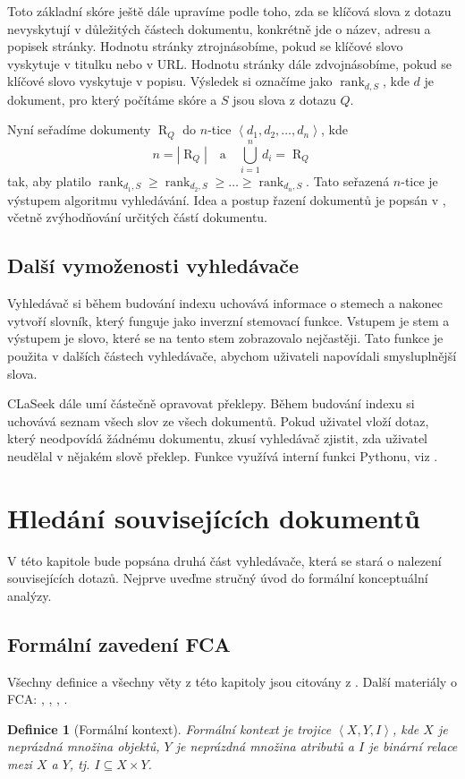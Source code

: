 \documentclass{article}
\newcommand{\name}{CLaSeek}
\newcommand{\ssection}[1]{\subsection{#1}}
\newcommand{\addsp}[1]{\left<#1\right>}
\DeclareMathOperator{\getdocs}{R}
\DeclareMathOperator{\rank}{rank}
\newtheorem{mydef}{Definice}
\begin{document}
Toto základní skóre ještě dále upravíme podle toho, zda se klíčová slova z dotazu nevyskytují v důležitých částech dokumentu, konkrétně jde o název, adresu a popisek stránky. Hodnotu stránky ztrojnásobíme, pokud se klíčové slovo vyskytuje v titulku nebo v URL. Hodnotu stránky dále zdvojnásobíme, pokud se klíčové slovo vyskytuje v popisu. Výsledek si označíme jako $\rank_{d,S}$, kde $d$ je dokument, pro který počítáme skóre a $S$ jsou slova z dotazu $Q$.



Nyní seřadíme dokumenty $\getdocs_Q$ do $n$-tice $\addsp{d_1, d_2, \ldots, d_n}$, kde 
$$n=\left|\getdocs_Q\right|\quad\mbox{a}\quad \bigcup_{i=1}^n d_i=\getdocs_Q$$ 
tak, aby platilo $\rank_{d_1, S} \ge \rank_{d_2, S} \ge \ldots \ge \rank_{d_n, S}$. Tato seřazená $n$-tice je výstupem algoritmu vyhledávání. Idea a postup řazení dokumentů je popsán v \cite{introir}, včetně zvýhodňování určitých částí dokumentu. 

\ssection{Další vymoženosti vyhledávače}
Vyhledávač si během budování indexu uchovává informace o stemech a nakonec vytvoří slovník, který funguje jako inverzní stemovací funkce. Vstupem je stem a výstupem je slovo, které se na tento stem zobrazovalo nejčastěji. Tato funkce je použita v dalších částech vyhledávače, abychom uživateli napovídali smysluplnější slova. 

\name{} dále umí částečně opravovat překlepy. Během budování indexu si uchovává seznam všech slov ze všech dokumentů. Pokud uživatel vloží dotaz, který neodpovídá žádnému dokumentu, zkusí vyhledávač zjistit, zda uživatel neudělal v nějakém slově překlep. Funkce využívá interní funkci Pythonu, viz \cite{pydiff}.


\newpage

\section{Hledání souvisejících dokumentů}
V této kapitole bude popsána druhá část vyhledávače, která se stará o nalezení souvisejících dotazů. Nejprve uveďme stručný úvod do formální konceptuální analýzy. 

\ssection{Formální zavedení FCA}
Všechny definice a všechny věty z této kapitoly jsou citovány z \cite{belfcaskr}. Další materiály o FCA: \cite{fcabook}, \cite{fcaslajdy1}, \cite{fcaslajdy2}, \cite{fcaslajdy3}.

\begin{mydef}[Formální kontext]
Formální kontext je trojice $\addsp{X, Y, I}$, kde $X$ je neprázdná množina objektů, $Y$ je neprázdná množina atributů a $I$ je binární relace mezi $X$ a $Y$, tj. $I\subseteq X\times Y$.
\end{mydef}
\end{document}
